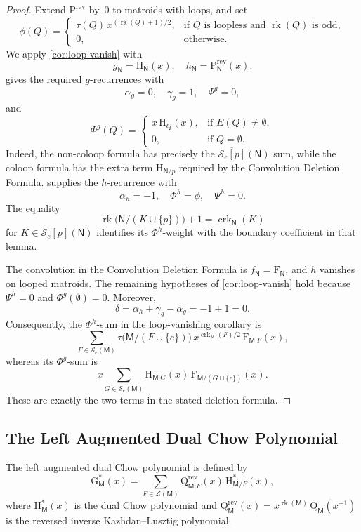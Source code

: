 \documentclass[12pt,letterpaper,english]{amsart}
\theoremstyle{teoremas}
\theoremstyle{definition}
\DeclareMathOperator{\rk}{rk}
\DeclareMathOperator{\crk}{crk}
\newcommand{\M}{\mathsf{M}}
\newcommand{\N}{\mathsf{N}}
\renewcommand{\H}{\mathrm{H}}
\newcommand{\Hstar}{\mathrm{H}^{*}}
\newcommand{\Gstar}{\mathrm{G}^{*}}
\newcommand{\PP}{\mathrm{P}}
\newcommand{\QQ}{\mathrm{Q}}
\newcommand{\FF}{\mathrm{F}}
\newcommand{\rev}{\mathrm{rev}}
\newcommand{\Se}{\mathcal{S}_e}
\begin{document}
\begin{proof}
Extend $\PP^{\rev}$ by~$0$ to matroids with loops, and set
\[
\phi(Q) =
\begin{cases}
\tau(Q)\, x^{(\rk(Q)+1)/2}, & \text{if $Q$ is loopless and $\rk(Q)$ is odd},\\
0, & \text{otherwise}.
\end{cases}
\]
We apply \cref{cor:loop-vanish} with
\[
g_{\N} = \H_{\N}(x),\quad h_{\N} = \PP^{\rev}_{\N}(x).
\]
 gives the required $g$-recurrences with
\[
\alpha_g = 0,\quad \gamma_g = 1,\quad \Psi^g = 0,
\]
and
\[
\Phi^g(Q) =
\begin{cases}
x\, \H_Q(x), & \text{if } E(Q) \neq \emptyset, \\
0, & \text{if } Q = \emptyset.
\end{cases}
\]
Indeed, the non-coloop formula has precisely the $\overline{\Se[p]}(\N)$
sum, while the coloop formula has the extra term $\H_{\N/p}$ required
by the Convolution Deletion Formula.
 supplies the $h$-recurrence with
\[
\alpha_h = -1,\quad \Phi^h = \phi,\quad \Psi^h = 0.
\]
The equality
\[
\rk\bigl(\N/(K \cup \{p\})\bigr) + 1 = \crk_{\N}(K)
\]
for $K \in \Se[p](\N)$ identifies its $\Phi^h$-weight with the boundary
coefficient in that lemma.

The convolution in the Convolution Deletion Formula is $f_{\N} = \FF_{\N}$,
and $h$ vanishes on looped matroids.  The remaining hypotheses of
\cref{cor:loop-vanish} hold because $\Psi^h = 0$ and $\Phi^g(\emptyset) = 0$.
Moreover,
\[
\delta = \alpha_h + \gamma_g - \alpha_g = -1 + 1 = 0.
\]
Consequently, the $\Phi^h$-sum in the loop-vanishing corollary is
\[
\sum_{F \in \Se(\M)}
  \tau\bigl(\M/(F \cup \{e\})\bigr)\, x^{\crk_{\M}(F)/2}\,
  \FF_{\M|F}(x),
\]
whereas its $\Phi^g$-sum is
\[
x \sum_{G \in \overline{\Se}(\M)}
  \H_{\M|G}(x)\, \FF_{\M/(G \cup \{e\})}(x).
\]
These are exactly the two terms in the stated deletion formula.
\end{proof}


\subsection{The Left Augmented Dual Chow Polynomial}
The left augmented dual Chow polynomial is defined by
\[
\Gstar_{\M}(x) = \sum_{F \in \mathcal{L}(\M)}
  \QQ^{\rev}_{\M|F}(x)\, \Hstar_{\M/F}(x),
\]
where $\Hstar_{\M}(x)$ is the dual Chow polynomial and
$\QQ^{\rev}_{\M}(x) = x^{\rk(\M)}\, \QQ_{\M}(x^{-1})$ is the
reversed inverse Kazhdan--Lusztig polynomial.
\end{document}
